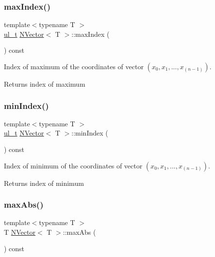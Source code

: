 \subsubsection{\texorpdfstring{maxIndex()}{maxIndex()}}
{\footnotesize\ttfamily template$<$typename T $>$ \\
\mbox{\hyperlink{typedef_8h_a1b140a2034db3f5dfe18a987745df43a}{ul\+\_\+t}} \mbox{\hyperlink{class_n_vector}{N\+Vector}}$<$ T $>$\+::max\+Index (\begin{DoxyParamCaption}{ }\end{DoxyParamCaption}) const}



Index of maximum of the coordinates of vector $ (x_0, x_1, ..., x_{(n-1)}) $. 

\begin{DoxyReturn}{Returns}
index of maximum 
\end{DoxyReturn}
\mbox{\label{class_n_vector_aea9d0e6c8b20628b5e09f8194484a8d3}} 
\subsubsection{\texorpdfstring{minIndex()}{minIndex()}}
{\footnotesize\ttfamily template$<$typename T $>$ \\
\mbox{\hyperlink{typedef_8h_a1b140a2034db3f5dfe18a987745df43a}{ul\+\_\+t}} \mbox{\hyperlink{class_n_vector}{N\+Vector}}$<$ T $>$\+::min\+Index (\begin{DoxyParamCaption}{ }\end{DoxyParamCaption}) const}



Index of minimum of the coordinates of vector $ (x_0, x_1, ..., x_{(n-1)}) $. 

\begin{DoxyReturn}{Returns}
index of minimum 
\end{DoxyReturn}
\mbox{\label{class_n_vector_a2d77a1ff10574ae5ca33fb3c11a087e2}} 
\subsubsection{\texorpdfstring{maxAbs()}{maxAbs()}}
{\footnotesize\ttfamily template$<$typename T $>$ \\
T \mbox{\hyperlink{class_n_vector}{N\+Vector}}$<$ T $>$\+::max\+Abs (\begin{DoxyParamCaption}{ }\end{DoxyParamCaption}) const}



